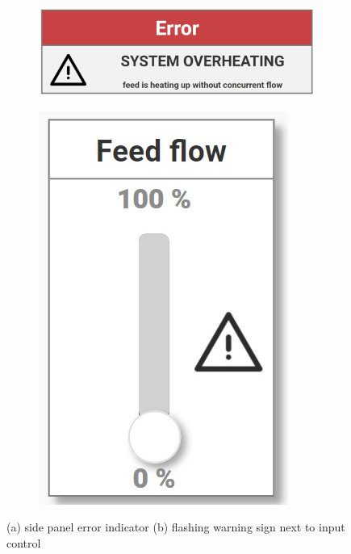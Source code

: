 \begin{figure}[htp]
    \centering
    \begin{subfigure}{0.5\textwidth}
        \centering
        \includegraphics[width=0.9\linewidth]{images/concept/elements/error.jpg}
        \caption{}
    \end{subfigure}%
    \begin{subfigure}{0.5\textwidth}
        \centering
        \includegraphics[width=0.4\linewidth]{images/concept/elements/error_feed_flash.jpg}
        \caption{}
    \end{subfigure}
    \caption { (a) side panel error indicator (b) flashing warning sign next to input control}
\label{fig:appendix_error}
\end{figure}
 
